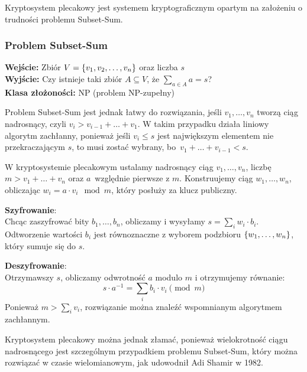 Kryptosystem plecakowy jest systemem kryptograficznym opartym na założeniu o trudności problemu Subset-Sum.

\subsubsection*{Problem Subset-Sum}
\textbf{Wejście:} Zbiór \( V = \set{v_1, v_2, \dots, v_n} \) oraz liczba \( s \) \\
\textbf{Wyjście:} Czy istnieje taki zbiór \( A \subseteq V \), że \( \sum_{a \in A} a = s \)? \\
\textbf{Klasa złożoności:} NP (problem NP-zupełny)

Problem Subset-Sum jest jednak łatwy do rozwiązania, jeśli \( v_1, \dots, v_n \) tworzą ciąg nadrosnący, czyli \( v_i > v_{i-1} + \ldots + v_1 \).
W takim przypadku działa liniowy algorytm zachłanny, ponieważ jeśli \( v_i \leq s \) jest największym elementem nie przekraczającym \( s \), to musi zostać wybrany, bo~\( v_1 + \ldots + v_{i-1} < s \).

W kryptosystemie plecakowym ustalamy nadrosnący ciąg \( v_1, \dots, v_n \), liczbę \( m > v_1 + \ldots + v_n \) oraz \( a \)~względnie pierwsze z \( m \).
Konstruujemy ciąg \( w_1, \dots, w_n \), obliczając \( w_i = a \cdot v_i \mod m \), który posłuży za klucz publiczny.

\textbf{Szyfrowanie}: \\
Chcąc zaszyfrować bity \( b_1, \dots, b_n \), obliczamy i wysyłamy \( s = \sum_i w_i \cdot b_i \). Odtworzenie wartości \( b_i \) jest równoznaczne z wyborem podzbioru \( \set{w_1, \ldots, w_n} \), który sumuje się do \( s \).

\textbf{Deszyfrowanie}: \\
Otrzymawszy \( s \), obliczamy odwrotność \( a \) modulo \( m \) i otrzymujemy równanie:
\[
    s \cdot a^{-1} = \sum_i b_i \cdot v_i \pmod{m}
\]
Ponieważ \( m > \sum_i v_i \), rozwiązanie można znaleźć wspomnianym algorytmem zachłannym.

Kryptosystem plecakowy można jednak złamać, ponieważ wielokrotność ciągu nadrosnącego jest szczególnym przypadkiem problemu Subset-Sum, który można rozwiązać w czasie wielomianowym, jak udowodnił Adi Shamir w 1982.